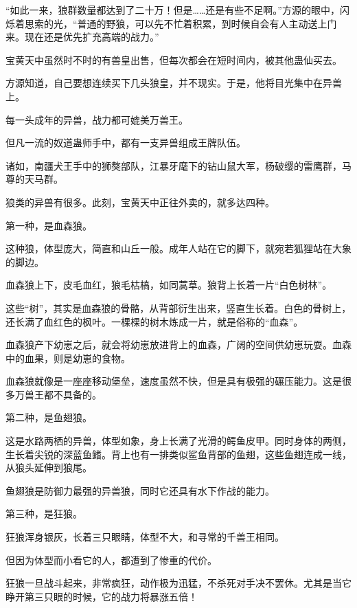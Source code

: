 
\begin{this_body}



“如此一来，狼群数量都达到了二十万！但是……还是有些不足啊。”方源的眼中，闪烁着思索的光，“普通的野狼，可以先不忙着积累，到时候自会有人主动送上门来。现在还是优先扩充高端的战力。”

宝黄天中虽然时不时的有兽皇出售，但每次都会在短时间内，被其他蛊仙买去。

方源知道，自己要想连续买下几头狼皇，并不现实。于是，他将目光集中在异兽上。

每一头成年的异兽，战力都可媲美万兽王。

但凡一流的奴道蛊师手中，都有一支异兽组成王牌队伍。

诸如，南疆犬王手中的狮獒部队，江暴牙麾下的钻山鼠大军，杨破缨的雷鹰群，马尊的天马群。

狼类的异兽有很多。此刻，宝黄天中正往外卖的，就多达四种。

第一种，是血森狼。

这种狼，体型庞大，简直和山丘一般。成年人站在它的脚下，就宛若狐狸站在大象的脚边。

血森狼上下，皮毛血红，狼毛枯槁，如同蒿草。狼背上长着一片“白色树林”。

这些“树”，其实是血森狼的骨骼，从背部衍生出来，竖直生长着。白色的骨树上，还长满了血红色的枫叶。一棵棵的树木炼成一片，就是俗称的“血森”。

血森狼产下幼崽之后，就会将幼崽放进背上的血森，广阔的空间供幼崽玩耍。血森中的血果，则是幼崽的食物。

血森狼就像是一座座移动堡垒，速度虽然不快，但是具有极强的碾压能力。这是很多万兽王都不具备的。

第二种，是鱼翅狼。

这是水路两栖的异兽，体型如象，身上长满了光滑的鳄鱼皮甲。同时身体的两侧，生长着尖锐的深蓝鱼鳍。背上也有一排类似鲨鱼背部的鱼翅，这些鱼翅连成一线，从狼头延伸到狼尾。

鱼翅狼是防御力最强的异兽狼，同时它还具有水下作战的能力。

第三种，是狂狼。

狂狼浑身银灰，长着三只眼睛，体型不大，和寻常的千兽王相同。

但因为体型而小看它的人，都遭到了惨重的代价。

狂狼一旦战斗起来，非常疯狂，动作极为迅猛，不杀死对手决不罢休。尤其是当它睁开第三只眼的时候，它的战力将暴涨五倍！


\end{this_body}
